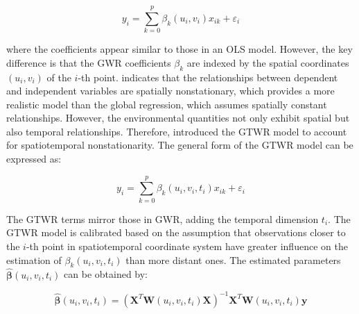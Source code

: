 \begin{equation}
y_i = \sum_{k=0}^{p} \beta_k(u_i, v_i) x_{ik} + \varepsilon_i
\label{eq:gwr}
\end{equation}




\noindent where the coefficients appear similar to those in an OLS model. However, the key difference is that the GWR coefficients \(\beta_k\) are indexed by the spatial coordinates \((u_i, v_i)\) of the \(i\)-th point.  indicates that the relationships between dependent and independent variables are spatially nonstationary, which provides a more realistic model than the global regression, which assumes spatially constant relationships. However, the environmental quantities not only exhibit spatial but also temporal relationships. Therefore, \citet{huang2010geographically} introduced the GTWR model to account for spatiotemporal nonstationarity. The general form of the GTWR model can be expressed as:

\begin{equation}
y_i = \sum_{k=0}^{p} \beta_k(u_i, v_i, t_i) x_{ik} + \varepsilon_i
\label{eq:gtwr}
\end{equation}

The GTWR terms mirror those in GWR, adding the temporal dimension $t_i$. The GTWR model is calibrated based on the assumption that observations closer to the $i$-th point in spatiotemporal coordinate system have greater influence on the estimation of $\beta_k(u_i, v_i, t_i)$ than more distant ones. The estimated parameters $\hat{\boldsymbol{\beta}}(u_i, v_i, t_i)$ can be obtained by:

\begin{equation}
\hat{\boldsymbol{\beta}}(u_i, v_i, t_i) = (\mathbf{X}^T\mathbf{W}(u_i, v_i, t_i)\mathbf{X})^{-1}\mathbf{X}^T\mathbf{W}(u_i, v_i, t_i) \mathbf{y}
\label{eq:coeff_gtwr}
\end{equation}

